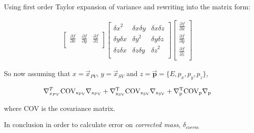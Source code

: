 Using first order Taylor expansion of variance and rewriting into the matrix form:

\begin{equation}
\begin{aligned}
       \begin{bmatrix}
		\frac{\partial{f}}{\partial{x}} & \frac{\partial{f}}{\partial{y}} & \frac{\partial{f}}{\partial{z}} \\
       \end{bmatrix}
       \begin{bmatrix}
	       {\delta x}^{2} & \delta x \delta y & \delta x \delta z  \\ 
	        \delta y \delta x & {\delta y}^{2} & \delta y \delta z  \\
	        \delta z \delta x & \delta z \delta y & {\delta z}^{2}  \\
       \end{bmatrix}
       \begin{bmatrix}
		\frac{\partial{f}}{\partial{x}} \\ \frac{\partial{f}}{\partial{y}} \\\frac{\partial{f}}{\partial{z}} \\
       \end{bmatrix}
\end{aligned}
\end{equation}

So now assuming that $x=\vec{{x}}_{PV}$, $y=\vec{{x}}_{SV}$ and $z=\mathbold{\vec{p}}=\{E,p_{x},p_{y},p_{z}\}$,

\begin{equation}
\begin{aligned}
       \nabla^{T}_{x_{PV}} \rm{COV_{x_{PV}}} \nabla_{x_{PV}} + \nabla^{T}_{x_{SV}} \rm{COV_{x_{SV}}} \nabla_{x_{SV}} + \nabla^{T}_{p} \rm{COV_{p}} \nabla_{p}
\end{aligned}
\end{equation}

where \rm{COV} is the covariance matrix.

In conclusion in order to calculate error on \textit{corrected mass}, $\delta_{corrm}$


